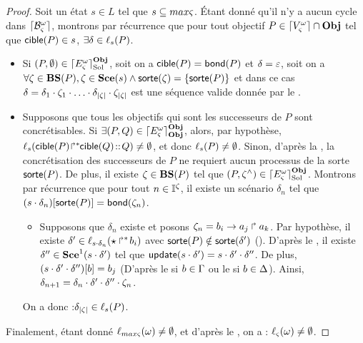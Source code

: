 \begin{proof}
  Soit un état $s \in L$ tel que $s \subseteq max\varsigma$.
  Étant donné qu'il n'y a aucun cycle dans $\lceil \mathcal{B}_\varsigma^\omega\rceil$, montrons par récurrence que
  pour tout objectif $P \in \lceil V_\varsigma^\omega\rceil \cap \mathbf{Obj}$ tel que $\mathsf{cible}(P) \in s$,
  $\exists \delta \in \ell_s(P)$.
  \begin{itemize}
    \item Si $(P, \emptyset) \in \lceil E_\varsigma^\omega\rceil^{\mathbf{Obj}}_{\mathrm{Sol}}$,
      soit on a $\mathsf{cible}(P) = \mathsf{bond}(P)$ et $\delta = \varepsilon$,
      soit on a $\forall \zeta \in \mathbf{BS}(P), \zeta \in \mathbf{Sce}(s) \wedge \mathsf{sorte}(\zeta) = \{ \mathsf{sorte}(P) \}$
      et dans ce cas $\delta = \delta_1 \PHplay \zeta_1 \PHplay \dots \PHplay
        \delta_{|\zeta|} \PHplay \zeta_{|\zeta|}$
      est une séquence valide donnée par le .
    \item Supposons que tous les objectifs qui sont les successeurs de $P$ sont concrétisables.
      Si $\exists (P, Q) \in \lceil E_\varsigma^\omega\rceil^{\mathbf{Obj}}_{\mathbf{Obj}}$, alors, par hypothèse,
        $\ell_{s}({\mathsf{cible}(P)\!\Rsh^*\!\!\mathsf{cible}(Q)} \!::\! Q) \neq \emptyset$, et donc
        $\ell_{s}(P) \neq \emptyset$.
      Sinon, d'après la , la concrétisation des successeurs de $P$ ne requiert
        aucun processus de la sorte $\mathsf{sorte}(P)$.
        De plus, il existe $\zeta \in \mathbf{BS}(P)$ tel que $(P, \zeta^\wedge) \in \lceil E_\varsigma^\omega\rceil^{\mathbf{Obj}}_{\mathrm{Sol}}$.
        Montrons par récurrence que pour tout $n \in \mathbb{I}^{\zeta}$, il existe un scénario
        $\delta_n$ tel que ${(s \cdot \delta_n)[\mathsf{sorte}(P)]} = \mathsf{bond}(\zeta_n)$.
        \begin{itemize} %
          \item[] Supposons que $\delta_n$ existe et posons $\zeta_n = b_i\rightarrow a_j\Rsh a_k$.
            Par hypothèse, il existe $\delta' \in \ell_{s \cdot \delta_n}(\mbox{$\star\Rsh^*\!b_i$})$
            avec $\mathsf{sorte}(P) \notin \mathsf{sorte}(\delta')$ ().
            D'après le , il existe
            $\delta'' \in \mathbf{Sce}^1(s \cdot \delta')$ tel que
            $\mathsf{update}(s \cdot \delta') = s \cdot \delta' \cdot \delta''$.
            De plus, ${(s \cdot \delta' \cdot \delta'')[b]} = b_j$
            (D'après le  si $b \in \Gamma$
            ou le  si $b \in \Delta$).
            Ainsi, $\delta_{n+1} = \delta_n \cdot \delta' \cdot \delta'' \cdot \zeta_n$.
        \end{itemize}
      On a donc :$\delta_{|\zeta|} \in \ell_s(P)$. %
  \end{itemize}
  Finalement, étant donné $\ell_{max\varsigma}(\omega) \neq \emptyset$,
  et d'après le ,
  on a : $\ell_\varsigma(\omega) \neq \emptyset$.
\end{proof}



